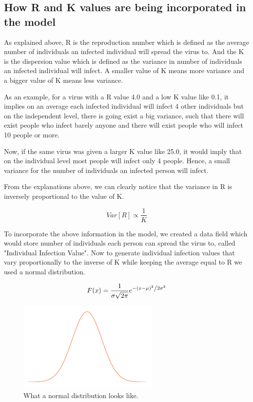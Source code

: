 \documentclass[11pt]{article}
\begin{document}
\subsection{How R and K values are being incorporated in the model}
As explained above, R is the reproduction number which is defined as the average number of individuals an infected individual will spread the virus to\cite{r_val}. And the K is the dispersion value which is defined as the variance in number of individuals an infected individual will infect. A smaller value of K means more variance and a bigger value of K means less variance.

As an example, for a virus with a R value 4.0 and a low K value like 0.1, it implies on an average each infected individual will infect 4 other individuals but on the independent level, there is going exist a big variance, such that there will exist people who infect barely anyone and there will exist people who will infect 10 people or more.

Now, if the same virus was given a larger K value like 25.0, it would imply that on the individual level most people will infect only 4 people. Hence, a small variance for the number of individuals an infected person will infect.

From the explanations above, we can clearly notice that the variance in R is inversely proportional to the value of K.

\begin{equation}
    Var[R] \propto \frac{1}{K}
\end{equation}

To incorporate the above information in the model, we created a data field which would store number of individuals each person can spread the virus to, called "Individual Infection Value". Now to generate individual infection values that vary proportionally to the inverse of K while keeping the average equal to R we used a normal distribution\cite{normal_dist}.

\begin{equation}
    F(x) = \frac{1}{{\sigma \sqrt {2\pi } }}e^{{{ - \left( {x - \mu } \right)^2 } \mathord{\left/ {\vphantom {{ - \left( {x - \mu } \right)^2 } {2\sigma ^2 }}} \right. \kern-\nulldelimiterspace} {2\sigma ^2 }}}
\end{equation}
\begin{figure}[H]
    \centering
    \includegraphics[width=7cm]{figures/normal_dist.png}
    \caption{What a normal distribution looks like.}
    \label{fig:normal_dist_ex}
\end{figure}
\end{document}
